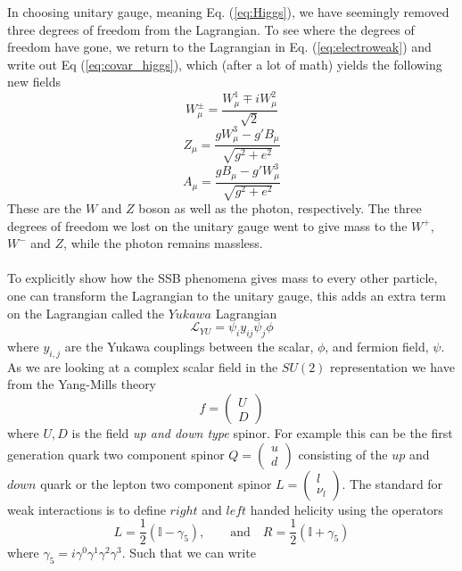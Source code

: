 \documentclass[12pt, a4paper]{book}
\begin{document}
In choosing unitary gauge, meaning Eq. (\ref{eq:Higgs}), we have seemingly removed three degrees of freedom from the Lagrangian. To see where the degrees of freedom have gone, we return to the Lagrangian in Eq. (\ref{eq:electroweak}) and write out
Eq (\ref{eq:covar_higgs}), which (after a lot of math) yields the following new fields
\begin{equation}\label{eq:W_boson}
    W_\mu^\pm = \frac{W_\mu^1 \mp iW_\mu^2}{\sqrt{2}}
\end{equation}
\begin{equation}\label{eq:Z_boson}
    Z_\mu = \frac{gW_\mu^3 - g'B_\mu}{\sqrt{g^2+e^2}}
\end{equation}
\begin{equation}\label{eq:photon}
    A_\mu = \frac{gB_\mu - g'W_\mu^3}{\sqrt{g^2+e^2}}
\end{equation}
These are the $W$ and $Z$ boson as well as the photon, respectively. The three degrees of freedom we lost on the unitary gauge went to give mass to the $W^+$, $W^-$ and $Z$, while the photon remains massless.\\
\\To explicitly show how the SSB phenomena gives mass to every other particle, one can transform the Lagrangian to the unitary gauge, 
this adds an extra term on the Lagrangian called the $Yukawa$ Lagrangian
$$
\mathcal{L}_{YU} = \psi_i y_{ij}\psi_j\phi
$$
where $y_{i,j}$ are the Yukawa couplings between the scalar, $\phi$, and fermion field, $\psi$. As we are looking at a complex scalar field in the $SU(2)$ representation we have from the Yang-Mills theory
$$
f=\begin{pmatrix}
    U\\D
\end{pmatrix}
$$
where $U,D$ is the field \textit{up and down type} spinor. For example this can be the first generation quark two component spinor $Q = \begin{pmatrix}
    u\\ d
\end{pmatrix}$ consisting of the $up$ and $down$ quark or the lepton two component spinor $L = \begin{pmatrix}
    l\\ \nu_l
\end{pmatrix}$. The standard for weak interactions is to define $right$ and $left$ handed helicity using the operators 
$$
L = \frac{1}{2}(\mathbb{I} - \gamma_5),\qquad\text{and}\quad R = \frac{1}{2}(\mathbb{I} + \gamma_5)
$$
where $\gamma_{5}=i\gamma^0\gamma^1\gamma^2\gamma^3$. Such that we can write 
\end{document}
